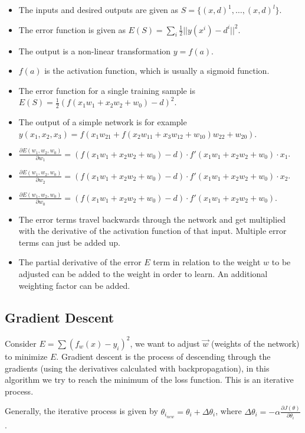 \documentclass[main]{subfiles}
\begin{document}
\begin{itemize}[noitemsep,nolistsep]
	\item The inputs and desired outputs are given as $S=\{(x,d)^1,\ldots,(x,d)^l\}$.
	\item The error function is given as $E(S) = \sum_i\frac{1}{2}||y(x^i)-d^i||^2$.
	\item The output is a non-linear transformation $y=f(a)$.
	\item $f(a)$ is the activation function, which is usually a sigmoid function.
	\item The error function for a single training sample is $E(S)=\frac{1}{2}(f(x_1w_1+x_2w_2+w_0)-d)^2$.
	\item The output of a simple network is for example $y(x_1,x_2,x_3)=f(x_1w_{21}+f(x_2w_{11}+x_3w_{12}+w_{10})w_{22}+w_{20})$.
	\item $\frac{\partial E(w_1,w_2,w_0)}{\partial w_1}=(f(x_1w_1+x_2w_2+w_0)-d)\cdot f'(x_1w_1+x_2w_2+w_0)\cdot x_1$.
	\item $\frac{\partial E(w_1,w_2,w_0)}{\partial w_2}=(f(x_1w_1+x_2w_2+w_0)-d)\cdot f'(x_1w_1+x_2w_2+w_0)\cdot x_2$.
	\item $\frac{\partial E(w_1,w_2,w_0)}{\partial w_0}=(f(x_1w_1+x_2w_2+w_0)-d)\cdot f'(x_1w_1+x_2w_2+w_0)$.
	\item The error terms travel backwards through the network and get multiplied with the derivative of the activation function of that input. Multiple error terms can just be added up.
	\item The partial derivative of the error $E$ term in relation to the weight $w$ to be adjusted can be added to the weight in order to learn. An additional weighting factor can be added.
\end{itemize}

\subsection{Gradient Descent}
Consider $E = \sum(f_w(x) - y_i)^2$, we want to adjust $\vec{w}$ (weights of the network) to minimize $E$.
Gradient descent is the process of descending through the gradients (using the derivatives calculated with backpropagation), in this algorithm we try to reach the minimum of the loss function.
This is an iterative process.

Generally, the iterative process is given by $\theta_{i_{new}} = \theta_i + \Delta \theta_i$, where $\Delta \theta_i = - \alpha \frac{\partial J(\theta)}{\partial \theta_i}$.
\end{document}

